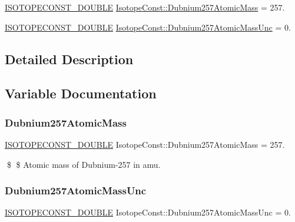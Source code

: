 \begin{DoxyCompactItemize}
\item 
\mbox{\hyperlink{group___isotope_const-_macros_ga8f45a7272ce02c0b4c65c44636ed719a}{I\+S\+O\+T\+O\+P\+E\+C\+O\+N\+S\+T\+\_\+\+D\+O\+U\+B\+LE}} \mbox{\hyperlink{group___isotope_const-_dubnium-_db257_ga40b05d798fe8e9ab2f0ce8976d27c921}{Isotope\+Const\+::\+Dubnium257\+Atomic\+Mass}} = 257.
\item 
\mbox{\hyperlink{group___isotope_const-_macros_ga8f45a7272ce02c0b4c65c44636ed719a}{I\+S\+O\+T\+O\+P\+E\+C\+O\+N\+S\+T\+\_\+\+D\+O\+U\+B\+LE}} \mbox{\hyperlink{group___isotope_const-_dubnium-_db257_ga76556f960f30195b7085370c050cf57f}{Isotope\+Const\+::\+Dubnium257\+Atomic\+Mass\+Unc}} = 0.
\end{DoxyCompactItemize}


\subsection{Detailed Description}


\subsection{Variable Documentation}
\mbox{\label{group___isotope_const-_dubnium-_db257_ga40b05d798fe8e9ab2f0ce8976d27c921}} 
\subsubsection{\texorpdfstring{Dubnium257\+Atomic\+Mass}{Dubnium257AtomicMass}}
{\footnotesize\ttfamily \mbox{\hyperlink{group___isotope_const-_macros_ga8f45a7272ce02c0b4c65c44636ed719a}{I\+S\+O\+T\+O\+P\+E\+C\+O\+N\+S\+T\+\_\+\+D\+O\+U\+B\+LE}} Isotope\+Const\+::\+Dubnium257\+Atomic\+Mass = 257.}

\$ \$ Atomic mass of Dubnium-\/257 in amu. \mbox{\label{group___isotope_const-_dubnium-_db257_ga76556f960f30195b7085370c050cf57f}} 
\subsubsection{\texorpdfstring{Dubnium257\+Atomic\+Mass\+Unc}{Dubnium257AtomicMassUnc}}
{\footnotesize\ttfamily \mbox{\hyperlink{group___isotope_const-_macros_ga8f45a7272ce02c0b4c65c44636ed719a}{I\+S\+O\+T\+O\+P\+E\+C\+O\+N\+S\+T\+\_\+\+D\+O\+U\+B\+LE}} Isotope\+Const\+::\+Dubnium257\+Atomic\+Mass\+Unc = 0.}


